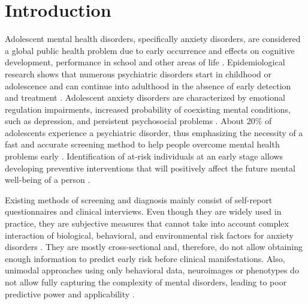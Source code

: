 \documentclass[10pt,letterpaper]{article}
\begin{document}


        \linenumbers

        \section*{Introduction}
        Adolescent mental health disorders, specifically anxiety disorders, are considered a global public health problem due to early occurrence and effects on cognitive development, performance in school and other areas of life \cite{ref36,ref37}. Epidemiological research shows that numerous psychiatric disorders start in childhood or adolescence and can continue into adulthood in the absence of early detection and treatment \cite{ref36,ref38}. Adolescent anxiety disorders are characterized by emotional regulation impairments, increased probability of coexisting mental conditions, such as depression, and persistent psychosocial problems \cite{ref17}. About 20\% of adolescents experience a psychiatric disorder, thus emphasizing the necessity of a fast and accurate screening method to help people overcome mental health problems early \cite{ref37}. Identification of at-risk individuals at an early stage allows developing preventive interventions that will positively affect the future mental well-being of a person \cite{ref38}.
        
        
        Existing methods of screening and diagnosis mainly consist of self-report questionnaires and clinical interviews. Even though they are widely used in practice, they are subjective measures that cannot take into account complex interaction of biological, behavioral, and environmental risk factors for anxiety disorders \cite{ref11,ref13}. They are mostly cross-sectional and, therefore, do not allow obtaining enough information to predict early risk before clinical manifestations. Also, unimodal approaches using only behavioral data, neuroimages or phenotypes do not allow fully capturing the complexity of mental disorders, leading to poor predictive power and applicability \cite{ref40}.
        
\end{document}
